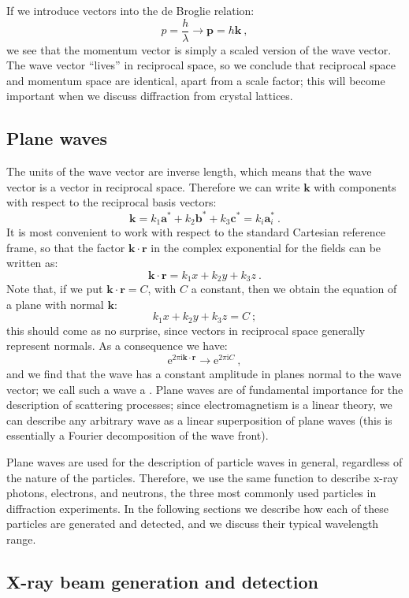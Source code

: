 If we introduce vectors into the de Broglie relation:
\[
	p = \frac{h}{\lambda}\rightarrow \mathbf{p} = h\mathbf{k}\ ,
\]
we see that the momentum vector is simply a scaled version of the wave vector. The wave vector ``lives'' in reciprocal space, so we conclude that reciprocal space and momentum space are identical, apart from a scale factor; this will become important when we discuss diffraction from crystal lattices.


\subsection{Plane waves}\label{\chabbr:ssec:planewaves}

The units of the wave vector are inverse length, which means that the wave vector is a vector in reciprocal space.  Therefore we can write $\mathbf{k}$ with components with respect to the reciprocal basis vectors:
\[
	\mathbf{k}=k_1\mathbf{a}^{\ast}+k_2\mathbf{b}^{\ast}+k_3\mathbf{c}^{\ast}=k_i\mathbf{a}^{\ast}_i\ .
\]
It is most convenient to work with respect to the standard Cartesian reference frame, so that the factor $\mathbf{k}\cdot\mathbf{r}$ in the complex exponential for the fields can be written as:
\[
	\mathbf{k}\cdot\mathbf{r}=k_1x+k_2y+k_3z\ .
\]
Note that, if we put $\mathbf{k}\cdot\mathbf{r}=C$, with $C$ a constant, then we obtain the equation of a plane with normal $\mathbf{k}$:
\[
	k_1x+k_2y+k_3z = C\ ;
\]
this should come as no surprise, since vectors in reciprocal space generally represent normals.  As a consequence we have:
\[
	\mathrm{e}^{2\pi\mathrm{i}\mathbf{k}\cdot\mathbf{r}}\rightarrow \mathrm{e}^{2\pi\mathrm{i}C}\ ,
\]
and we find that the wave has a constant amplitude in planes normal to the wave vector; we call such a wave a .  Plane waves are of fundamental importance for the description of scattering processes; since electromagnetism is a linear theory, we can describe any arbitrary wave as a linear superposition of plane waves (this is essentially a Fourier decomposition of the wave front).  

Plane waves are used for the description of particle waves in general, regardless of the nature of the particles.  Therefore, we use the same function to describe x-ray photons, electrons, and neutrons, the three most commonly used particles in diffraction experiments. In the following sections we describe how each of these particles are generated and detected, and we discuss their typical wavelength range.


\subsection{X-ray beam generation and detection}\label{\chabbr:ssec:xrayprod}

